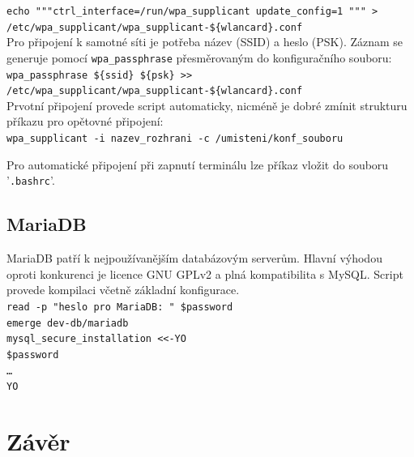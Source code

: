 \documentclass[12pt,a4paper,twoside,]{article}
\begin{document}
{{{{{{\texttt{echo """ctrl\_interface=/run/wpa\_supplicant
	update\_config=1 """ > \hspace*{1.5em}/etc/wpa\_supplicant/wpa\_supplicant-\$\{wlancard\}.conf}\\

\hspace{-1.5em}Pro připojení k samotné síti je potřeba název (SSID) a heslo (PSK). Záznam se generuje pomocí \texttt{wpa\_passphrase} přesměrovaným do konfiguračního souboru: \\

\texttt{wpa\_passphrase \$\{ssid\} \$\{psk\} >> \\\hspace*{1.5em}/etc/wpa\_supplicant/wpa\_supplicant-\$\{wlancard\}.conf}\\

\hspace{-1.5em}Prvotní připojení provede script automaticky, nicméně je dobré zmínit strukturu příkazu pro opětovné připojení:\\

\texttt{wpa\_supplicant -i nazev\_rozhrani -c /umisteni/konf\_souboru}

\hspace*{-1.5em}Pro automatické připojení při zapnutí terminálu lze příkaz vložit do souboru '\texttt{.bashrc}'.
\subsection{\textsf{MariaDB}}
MariaDB patří k nejpoužívanějším databázovým serverům. Hlavní výhodou oproti konkurenci je licence GNU GPLv2 a plná kompatibilita s MySQL. Script provede kompilaci včetně základní konfigurace.\\

\texttt{read -p "heslo pro MariaDB: " \$password}\\
\hspace*{1.5em}\texttt{emerge dev-db/mariadb}\\
\hspace*{1.5em}\texttt{mysql\_secure\_installation <<-YO}\\
\hspace*{3em}\texttt{\$password}\\
\hspace*{3em}\texttt{\dots}\\
\hspace*{1.5em}\texttt{YO}

\newpage
\section{\textsf{Závěr}}
\newpage
}}}}}}
\end{document}
